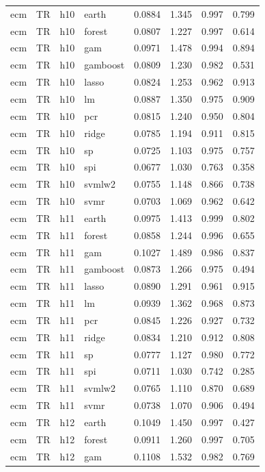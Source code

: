 \begin{ThreePartTable}
\begin{longtable}[t]{llclcccc}
\addlinespace
ecm & TR & h10 & earth & 0.0884 & 1.345 & 0.997 & 0.799\\
ecm & TR & h10 & forest & 0.0807 & 1.227 & 0.997 & 0.614\\
ecm & TR & h10 & gam & 0.0971 & 1.478 & 0.994 & 0.894\\
ecm & TR & h10 & gamboost & 0.0809 & 1.230 & 0.982 & 0.531\\
ecm & TR & h10 & lasso & 0.0824 & 1.253 & 0.962 & 0.913\\
ecm & TR & h10 & lm & 0.0887 & 1.350 & 0.975 & 0.909\\
ecm & TR & h10 & pcr & 0.0815 & 1.240 & 0.950 & 0.804\\
ecm & TR & h10 & ridge & 0.0785 & 1.194 & 0.911 & 0.815\\
ecm & TR & h10 & sp & 0.0725 & 1.103 & 0.975 & 0.757\\
ecm & TR & h10 & spi & 0.0677 & 1.030 & 0.763 & 0.358\\
ecm & TR & h10 & svmlw2 & 0.0755 & 1.148 & 0.866 & 0.738\\
ecm & TR & h10 & svmr & 0.0703 & 1.069 & 0.962 & 0.642\\
\addlinespace
ecm & TR & h11 & earth & 0.0975 & 1.413 & 0.999 & 0.802\\
ecm & TR & h11 & forest & 0.0858 & 1.244 & 0.996 & 0.655\\
ecm & TR & h11 & gam & 0.1027 & 1.489 & 0.986 & 0.837\\
ecm & TR & h11 & gamboost & 0.0873 & 1.266 & 0.975 & 0.494\\
ecm & TR & h11 & lasso & 0.0890 & 1.291 & 0.961 & 0.915\\
ecm & TR & h11 & lm & 0.0939 & 1.362 & 0.968 & 0.873\\
ecm & TR & h11 & pcr & 0.0845 & 1.226 & 0.927 & 0.732\\
ecm & TR & h11 & ridge & 0.0834 & 1.210 & 0.912 & 0.808\\
ecm & TR & h11 & sp & 0.0777 & 1.127 & 0.980 & 0.772\\
ecm & TR & h11 & spi & 0.0711 & 1.030 & 0.742 & 0.285\\
ecm & TR & h11 & svmlw2 & 0.0765 & 1.110 & 0.870 & 0.689\\
ecm & TR & h11 & svmr & 0.0738 & 1.070 & 0.906 & 0.494\\
\addlinespace
ecm & TR & h12 & earth & 0.1049 & 1.450 & 0.997 & 0.427\\
ecm & TR & h12 & forest & 0.0911 & 1.260 & 0.997 & 0.705\\
ecm & TR & h12 & gam & 0.1108 & 1.532 & 0.982 & 0.769\\

\end{longtable}
\end{ThreePartTable}
